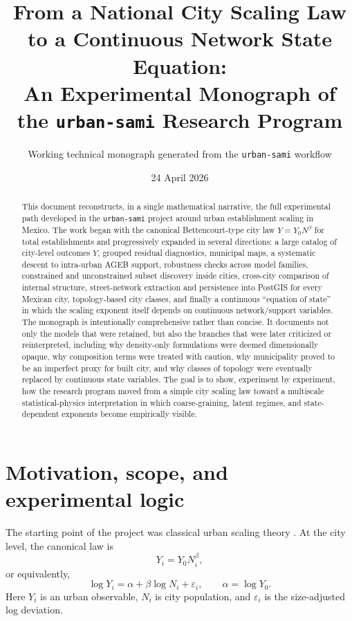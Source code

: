 \documentclass[11pt]{article}
\title{\textbf{From a National City Scaling Law to a Continuous Network State Equation:\\
An Experimental Monograph of the \texttt{urban-sami} Research Program}}
\author{Working technical monograph generated from the \texttt{urban-sami} workflow}
\date{24 April 2026}
\begin{document}
\maketitle
\tableofcontents
\clearpage

\begin{abstract}
This document reconstructs, in a single mathematical narrative, the full experimental path developed in the \texttt{urban-sami} project around urban establishment scaling in Mexico. The work began with the canonical Bettencourt-type city law
\(
Y = Y_0 N^\beta
\)
for total establishments and progressively expanded in several directions: a large catalog of city-level outcomes \(Y\), grouped residual diagnostics, municipal maps, a systematic descent to intra-urban AGEB support, robustness checks across model families, constrained and unconstrained subset discovery inside cities, cross-city comparison of internal structure, street-network extraction and persistence into PostGIS for every Mexican city, topology-based city classes, and finally a continuous ``equation of state'' in which the scaling exponent itself depends on continuous network/support variables. The monograph is intentionally comprehensive rather than concise. It documents not only the models that were retained, but also the branches that were later criticized or reinterpreted, including why density-only formulations were deemed dimensionally opaque, why composition terms were treated with caution, why municipality proved to be an imperfect proxy for built city, and why classes of topology were eventually replaced by continuous state variables. The goal is to show, experiment by experiment, how the research program moved from a simple city scaling law toward a multiscale statistical-physics interpretation in which coarse-graining, latent regimes, and state-dependent exponents become empirically visible.
\end{abstract}

\section{Motivation, scope, and experimental logic}

The starting point of the project was classical urban scaling theory \citep{bettencourt2007growth,bettencourt2010urban,bettencourt2013origins,bettencourt2021ius}. At the city level, the canonical law is
\begin{equation}
Y_i = Y_0 N_i^\beta,
\label{eq:canonical-power}
\end{equation}
or equivalently,
\begin{equation}
\log Y_i = \alpha + \beta \log N_i + \varepsilon_i,
\qquad \alpha = \log Y_0.
\label{eq:canonical-log}
\end{equation}
Here \(Y_i\) is an urban observable, \(N_i\) is city population, and \(\varepsilon_i\) is the size-adjusted log deviation.
\end{document}
